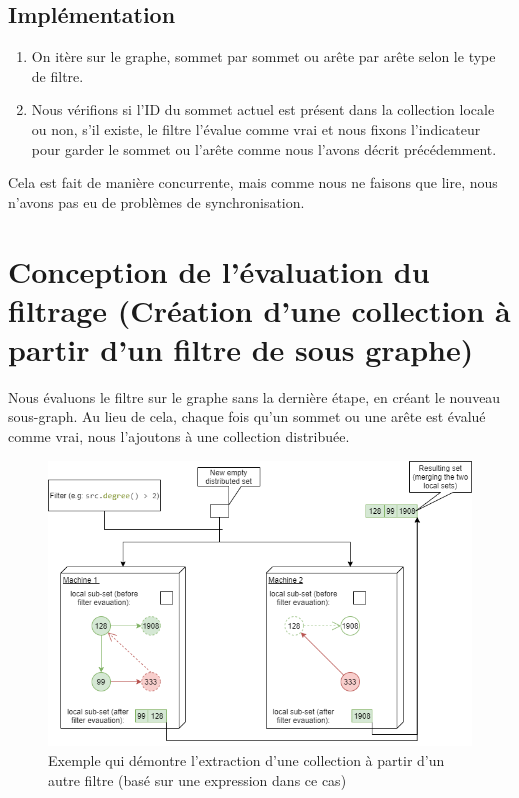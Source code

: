 \subsection{Implémentation}
\begin{enumerate}[label=\arabic*)]
\item  On itère sur le graphe, sommet par sommet ou arête par arête selon le type de filtre.
\item  Nous vérifions si l'ID du sommet actuel est présent dans la collection locale ou non, s'il existe, le filtre l'évalue comme vrai et nous fixons l'indicateur pour garder le sommet ou l'arête comme nous l'avons décrit précédemment.
\end{enumerate}
Cela est fait de manière concurrente, mais comme nous ne faisons que lire, nous n'avons pas eu de problèmes de synchronisation.


\section{Conception de l'évaluation du filtrage (Création d’une collection à partir d’un filtre de sous graphe)}
Nous évaluons le filtre sur le graphe sans la dernière étape, en créant le nouveau sous-graph. Au lieu de cela, chaque fois qu'un sommet ou une arête est évalué comme vrai, nous l'ajoutons à une collection distribuée.\\
\begin{figure}[H]  
  \centering
    \includegraphics[width=1\textwidth]{chapitre3/Figures/CreateSetFromFilter.png}
  \caption{Exemple qui démontre l'extraction d'une collection à partir d'un autre filtre (basé sur une expression dans ce cas)}
\end{figure}